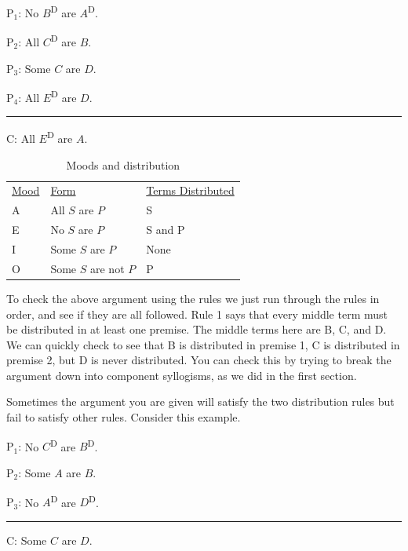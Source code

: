 \begin{earg} 
\item[P$_1$:] No $B$\textsuperscript{D} are $A$\textsuperscript{D}.
\item[P$_2$:] All $C$\textsuperscript{D} are $B$. %
\item[P$_3$:] Some $C$ are $D$.  %
\item[P$_4$:] All $E$\textsuperscript{D} are $D$.
\vspace{-.5em} 
 \item [] \rule{0.2\linewidth}{.5pt} 
\item[C:] All $E$\textsuperscript{D} are $A$.  %
 \end{earg} 

\begin{table}
\begin{mdframed}[style=mytablehalfbox, userdefinedwidth=.6\textwidth]
\begin{tabu}{p{.1\linewidth}p{.4\linewidth}p{.5\linewidth}}
 \underline{Mood} & \underline{Form} & \underline{Terms Distributed} \\ 
A & All $S$ are $P$ & S\\
E & No $S$ are $P$ &  S and P\\
I & Some $S$ are $P$ & None\\
O &Some $S$ are not $P$ & P \\
\end{tabu}
\end{mdframed}
\caption{Moods and distribution}\label{tab:distribution_reminder}
\end{table}

To check the above argument using the rules we just run through the rules in order, and see if they are all followed. Rule 1 says that every middle term must be distributed in at least one premise. The middle terms here are B, C, and D. We can quickly check to see that B is distributed in premise 1, C is distributed in premise 2, but D is never distributed. You can check this by trying to break the argument down into component syllogisms, as we did in the first section.

Sometimes the argument you are given will satisfy the two distribution rules but fail to satisfy other rules. Consider this example.

\begin{earg} 
\item[P$_1$:] No $C$\textsuperscript{D} are $B$\textsuperscript{D}.
\item[P$_2$:] Some $A$ are $B$. %
\item[P$_3$:] No $A$\textsuperscript{D} are $D$\textsuperscript{D}. 
\vspace{-.5em} 
 \item [] \rule{0.2\linewidth}{.5pt} 
\item[C:] Some $C$ are $D$. %
 \end{earg} 


